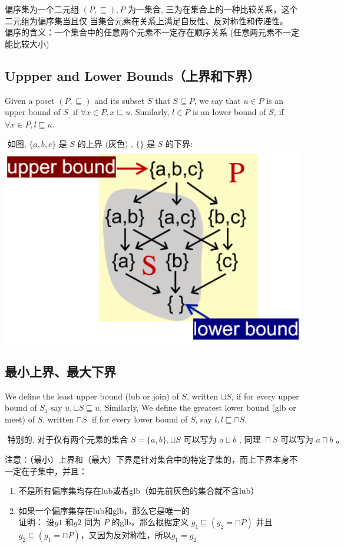 \documentclass[a4paper]{article}
\theoremstyle{definition}
\begin{document}
偏序集为一个二元组 $(P, \sqsubseteq), P$ 为一集合, 三为在集合上的一种比较关系，这个二元组为偏序集当且仅
当集合元素在关系上满足自反性、反对称性和传递性。\\
偏序的含义：一个集合中的任意两个元素不一定存在顺序关系 (任意两元素不一定能比较大小)
\subsection{Uppper and Lower Bounds（上界和下界）}
Given a poset $(P, \sqsubseteq)$ and its subset $S$ that $S \subseteq P$, we say that $u \in P$ is an upper bound of
$S_{,}$ if $\forall x \in P, x \sqsubseteq u$. Similarly, $l \in P$ is an lower bound of $S$, if $\forall x \in P, l \sqsubseteq u$.

$\text { 如图, }\{a, b, c\} \text { 是 } S \text { 的上界 (灰色) , }\{\} \text { 是 } S \text { 的下界: }$\\
\includegraphics{img/upper_bound.png}

\subsection{最小上界、最大下界}
We define the least upper bound (lub or join) of $S$, written $\sqcup S$, if for every upper bound
of $S_{1}$ say $u, \sqcup S \sqsubseteq u$. Similarly, We define the greatest lower bound (glb or meet) of $S$,
written $\sqcap S_{,}$ if for every lower bound of $S$, say $l, l \sqsubseteq \sqcap S$.

$\text { 特别的, 对于仅有两个元素的集合 } S=\{a, b\}, \sqcup S \text { 可以写为 } a \sqcup b \text { , 同理 } \sqcap S \text { 可以写为 } a \sqcap b \text { 。 }$

注意：（最小）上界和（最大）下界是针对集合中的特定子集的，而上下界本身不一定在子集中，并且：
\begin{enumerate}
  \item 不是所有偏序集均存在lub或者glb（如先前灰色的集合就不含lub）
  \item 如果一个偏序集存在lub和glb，那么它是唯一的\\
  证明： 设$g1$ 和$g2$ 同为 $P$ 的glb，那么根据定义 $g_1\sqsubseteq(g_2=\sqcap P)$ 并且$g_2\sqsubseteq(g_1=\sqcap P)$，又因为反对称性，所以$g_1=g_2$
  \end{enumerate}
\end{document}

